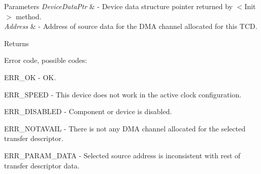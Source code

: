 \begin{DoxyParams}{Parameters}
{\em Device\-Data\-Ptr} & -\/ Device data structure pointer returned by $<$\-Init$>$ method. \\
\hline
{\em Address} & -\/ Address of source data for the D\-M\-A channel allocated for this T\-C\-D. \\
\hline
\end{DoxyParams}
\begin{DoxyReturn}{Returns}

\begin{DoxyItemize}
\item Error code, possible codes\-:
\begin{DoxyItemize}
\item E\-R\-R\-\_\-\-O\-K -\/ O\-K.
\item E\-R\-R\-\_\-\-S\-P\-E\-E\-D -\/ This device does not work in the active clock configuration.
\item E\-R\-R\-\_\-\-D\-I\-S\-A\-B\-L\-E\-D -\/ Component or device is disabled.
\item E\-R\-R\-\_\-\-N\-O\-T\-A\-V\-A\-I\-L -\/ There is not any D\-M\-A channel allocated for the selected transfer descriptor.
\item E\-R\-R\-\_\-\-P\-A\-R\-A\-M\-\_\-\-D\-A\-T\-A -\/ Selected source address is inconsistent with rest of transfer descriptor data. 
\end{DoxyItemize}
\end{DoxyItemize}
\end{DoxyReturn}
